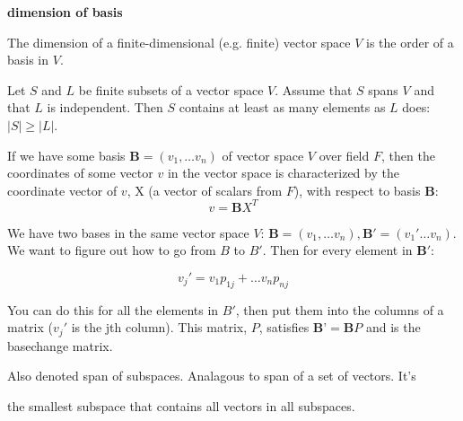 \begin{definition}{\bfseries dimension of basis}

  The dimension of a finite-dimensional (e.g. finite) vector space $V$ is the
  order of a basis in $V$.

\end{definition}

\begin{definition}

  Let $S$ and $L$ be finite subsets of a vector space $V$. Assume that $S$ spans
  $V$ and that $L$ is independent. Then $S$ contains at least as many elements
  as $L$ does: $|S| \geq |L|$.

\end{definition}

\begin{definition}

  If we have some basis $\textbf{B} = (v_{1},\ldots v_{n})$ of vector space $V$
  over field $F$, then the coordinates of some vector $v$ in the vector space is
  characterized by the coordinate vector of $v$, X (a vector of scalars from
  $F$), with respect to basis $\textbf{B}$:
\[v = \textbf{B}X^{T}\]

\end{definition}

\begin{definition}

  We have two bases in the same vector space $V$: $\textbf{B} = (v_{1}, \ldots v_{n}),\textbf{B}'= (v_{1}'\ldots v_{n})$. We want to figure out how to go from $B$ to $B'$. Then for every element in $\textbf{B}'$:

  \[v_{j}'=v_{1}p_{1j}+\ldots v_{n}p_{nj}\]

  You can do this for all the elements in $B'$, then put them into the columns
of a matrix ($v_{j}'$ is the jth column). This matrix, $P$, satisfies
$\textbf{B'} = \textbf{B}P$ and is the basechange matrix.

\end{definition}

\begin{definition}
  Also denoted span of subspaces. Analagous to span of a set of vectors. It's

  the smallest subspace that contains all vectors in all subspaces.

\end{definition}

